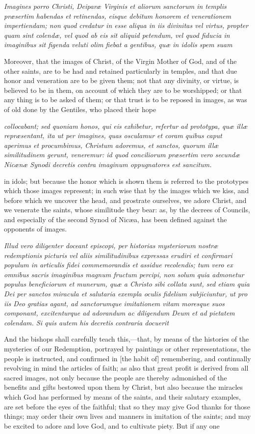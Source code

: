 \emph{Imagines porro Christi, Deiparæ Virginis et aliorum sanctorum in templis præsertim habendas et retinendas, eisque debitum honorem et venerationem impertiendam; non quod credatur in esse aliqua in iis divinitas vel virtus, propter quam sint colendæ, vel quod ab eis sit aliquid petendum, vel quod fiducia in imaginibus sit figenda veluti olim fiebat a gentibus, quæ in idolis spem suam}

Moreover, that the images of Christ, of the Virgin Mother of God, and of the other saints, are to be had and retained particularly in temples, and that due honor and veneration are to be given them; not that any divinity, or virtue, is believed to be in them, on account of which they are to be worshipped; or that any thing is to be asked of them; or that trust is to be reposed in images, as was of old done by the Gentiles, who placed their hope

\emph{collocabant; sed quoniam honos, qui eis exhibetur, refertur ad prototypa, quæ illæ repræsentant, ita ut per imagines, quas osculamur et coram quibus caput aperimus et procumbimus, Christum adoremus, et sanctos, quorum illæ similitudinem gerunt, veneremur: id quod conciliorum præsertim vero secundæ Nicænæ Synodi decretis contra imaginum oppugnatores est sancitum.}

in idols; but because the honor which is shown them is referred to the prototypes which those images represent; in such wise that by the images which we kiss, and before which we uncover the head, and prostrate ourselves, we adore Christ, and we venerate the saints, whose similitude they bear: as, by the decrees of Councils, and especially of the second Synod of Nicæa, has been defined against the opponents of images.

\emph{Illud vero diligenter doceant episcopi, per historias mysteriorum nostræ redemptionis picturis vel aliis similitudinibus expressas erudiri et confirmari populum in articulis fidei commemorandis et assidue recolendis; tum vero ex omnibus sacris imaginibus magnum fructum percipi, non solum quia admonetur populus beneficiorum et munerum, quæ a Christo sibi collata sunt, sed etiam quia Dei per sanctos miracula et salutaria exempla oculis fidelium subjiciuntur, ut pro iis Deo gratias agant, ad sanctorumque imitationem vitam moresque suos componant, excitenturque ad adorandum ac diligendum Deum et ad pietatem colendam. Si quis autem his decretis contraria docuerit }

And the bishops shall carefully teach this,—that, by means of the histories of the mysteries of our Redemption, portrayed by paintings or other representations, the people is instructed, and confirmed in [the habit of] remembering, and continually revolving in mind the articles of faith; as also that great profit is derived from all sacred images, not only because the people are thereby admonished of the benefits and gifts bestowed upon them by Christ, but also because the miracles which God has performed by means of the saints, and their salutary examples, are set before the eyes of the faithful; that so they may give God thanks for those things; may order their own lives and manners in imitation of the saints; and may be excited to adore and love God, and to cultivate piety. But if any one

